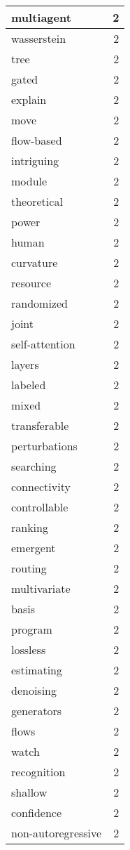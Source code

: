 \begin{table}[h]
\begin{tabular}{|l|r|}
multiagent & 2 \\
\hline
wasserstein & 2 \\
\hline
tree & 2 \\
\hline
gated & 2 \\
\hline
explain & 2 \\
\hline
move & 2 \\
\hline
flow-based & 2 \\
\hline
intriguing & 2 \\
\hline
module & 2 \\
\hline
theoretical & 2 \\
\hline
power & 2 \\
\hline
human & 2 \\
\hline
curvature & 2 \\
\hline
resource & 2 \\
\hline
randomized & 2 \\
\hline
joint & 2 \\
\hline
self-attention & 2 \\
\hline
layers & 2 \\
\hline
labeled & 2 \\
\hline
mixed & 2 \\
\hline
transferable & 2 \\
\hline
perturbations & 2 \\
\hline
searching & 2 \\
\hline
connectivity & 2 \\
\hline
controllable & 2 \\
\hline
ranking & 2 \\
\hline
emergent & 2 \\
\hline
routing & 2 \\
\hline
multivariate & 2 \\
\hline
basis & 2 \\
\hline
program & 2 \\
\hline
lossless & 2 \\
\hline
estimating & 2 \\
\hline
denoising & 2 \\
\hline
generators & 2 \\
\hline
flows & 2 \\
\hline
watch & 2 \\
\hline
recognition & 2 \\
\hline
shallow & 2 \\
\hline
confidence & 2 \\
\hline
non-autoregressive & 2 \\
\hline

\end{tabular}
\end{table}
